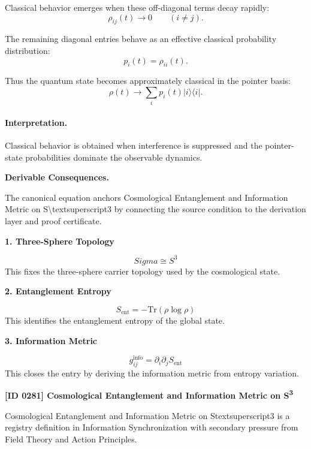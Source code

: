 Classical behavior emerges when these off-diagonal terms decay rapidly:
\begin{equation}
\rho_{ij}(t)\rightarrow 0
\qquad
(i\neq j).
\end{equation}

The remaining diagonal entries behave as an effective classical probability distribution:
\begin{equation}
p_i(t)=\rho_{ii}(t).
\end{equation}

Thus the quantum state becomes approximately classical in the pointer basis:
\begin{equation}
\boxed{
\rho(t)
\longrightarrow
\sum_i p_i(t)|i\rangle\langle i|.
}
\end{equation}

\paragraph{Interpretation.}
Classical behavior is obtained when interference is suppressed and the pointer-state probabilities dominate the observable dynamics.

\par\vspace{0.35em}
\noindent\textbf{Derivable Consequences.}\quad
\begingroup
\footnotesize
\raggedright
The canonical equation anchors Cosmological Entanglement and Information Metric on S\textbackslash{}textsuperscript3 by connecting the source condition to the derivation layer and proof certificate.
\par\endgroup

\noindent\textbf{1. Three-Sphere Topology}\par
\[
Sigma \cong S^3
\]
\noindent This fixes the three-sphere carrier topology used by the cosmological state.\par
\noindent\textbf{2. Entanglement Entropy}\par
\[
S_{\mathrm{ent}} = -\mathrm{Tr}(\rho \log \rho)
\]
\noindent This identifies the entanglement entropy of the global state.\par
\noindent\textbf{3. Information Metric}\par
\[
g^{\mathrm{info}}_{ij} = \partial_i \partial_j S_{\mathrm{ent}}
\]
\noindent This closes the entry by deriving the information metric from entropy variation.\par

\clearpage
\noindent\textbf{[ID 0281] Cosmological Entanglement and Information Metric on S\textsuperscript3}\par
\vspace{0.35em}
\begingroup\small
{}
Cosmological Entanglement and Information Metric on Stextsuperscript3 is a registry definition in Information Synchronization with secondary pressure from Field Theory and Action Principles.


